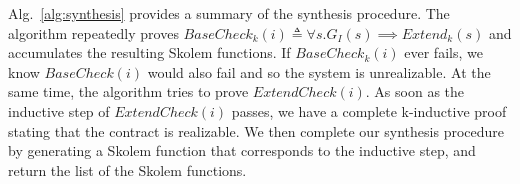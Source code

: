 Alg.~\ref{alg:synthesis} provides a summary of the synthesis
procedure. The algorithm repeatedly proves $\mathit{BaseCheck_k(i)}
\triangleq \forall s. G_I(s) \implies \mathit{Extend}_k(s)$ and
accumulates the resulting Skolem functions. If
$\mathit{BaseCheck_k(i)}$ ever fails, we know $\mathit{BaseCheck(i)}$
would also fail and so the system is unrealizable. At the same time,
the algorithm tries to prove $\mathit{ExtendCheck(i)}$. As soon as the
inductive step of $\mathit{ExtendCheck(i)}$ passes, we have a complete
k-inductive proof stating that the contract is realizable. We then
complete our synthesis procedure by generating a Skolem function that
corresponds to the inductive step, and return the list of the Skolem
functions.

\begin{figure}[t]
\begin{minipage}{0.65\textwidth}
\end{minipage}
\hspace{-1.5cm}
\begin{minipage}[t]{0.38\textwidth}
\end{minipage}
\end{figure}

